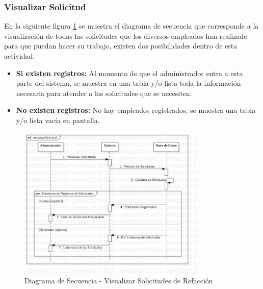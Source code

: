 \subsubsection{Visualizar Solicitud}
En la siguiente figura \ref{fig:Diagrama de Secuencia - Visualizar Solicitudes de Refaccion} se muestra el diagrama de secuencia que corresponde a la visualización de todas las solicitudes que los diversos empleados han realizado para que puedan hacer su trabajo, existen dos posibilidades dentro de esta actividad:
\begin{itemize}
	\item \textbf{Si existen registros:} Al momento de que el administrador entra a esta parte del sistema, se muestra en una tabla y/o lista toda la información necesaria para atender a las solicitudes que se necesiten.  
	\item \textbf{No existen registros:} No hay empleados registrados, se muestra una tabla y/o lista vacía en pantalla.
\end{itemize}
\begin{figure}[!h]
	\centering
	\includegraphics[width=0.8\textwidth]{./diseno/vprocesos/imagenes/visualizarSolicitud}
	\caption{Diagrama de Secuencia - Visualizar Solicitudes de Refacción}
	\label{fig:Diagrama de Secuencia - Visualizar Solicitudes de Refaccion}
\end{figure}
\clearpage